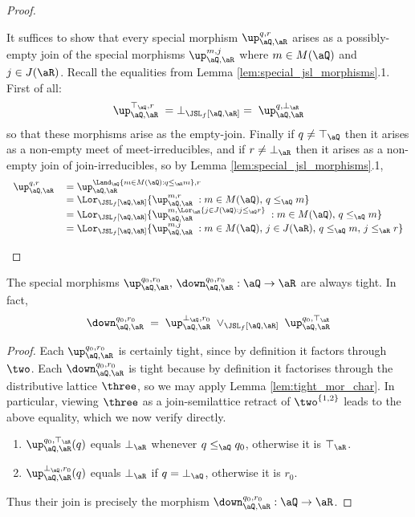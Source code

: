 \documentclass{article}
\begin{document}
\begin{proof}
\begin{enumerate}
It suffices to show that every special morphism $\up_{\aQ,\aR}^{q,r}$ arises as a possibly-empty join of the special morphisms $\up_{\aQ,\aR}^{m,j}$ where $m \in M(\aQ)$ and $j \in J(\aR)$. Recall the equalities from Lemma \ref{lem:special_jsl_morphisms}.1. First of all:
\[
\up_{\aQ,\aR}^{\top_\aQ,r} \; = \bot_{\JSL_f[\aQ,\aR]} = \; \up_{\aQ,\aR}^{q,\bot_\aR}
\]
so that these morphisms arise as the empty-join. Finally if $q \neq \top_\aQ$ then it arises as a non-empty meet of meet-irreducibles, and if $r \neq \bot_\aR$ then it arises as a non-empty join of join-irreducibles, so by Lemma \ref{lem:special_jsl_morphisms}.1,
\[
\begin{tabular}{lll}
$\up_{\aQ,\aR}^{q,r}$
&
$= \up_{\aQ,\aR}^{\Land_\aQ \{m \in M(\aQ) : q \leq_\aR m\},r}$
\\&
$= \Lor_{\JSL_f[\aQ,\aR]} \{ \up_{\aQ,\aR}^{m,r} \; : m \in M(\aQ), \, q \leq_\aQ m \}$
\\&
$= \Lor_{\JSL_f[\aQ,\aR]} \{ \up_{\aQ,\aR}^{m,\Lor_\aR \{ j \in J(\aQ) : j \leq_\aQ r \} } \; : m \in M(\aQ), \, q \leq_\aQ m \}$
\\&
$= \Lor_{\JSL_f[\aQ,\aR]} \{ \up_{\aQ,\aR}^{m,j} \; : m \in M(\aQ), \, j \in J(\aR), \, q \leq_\aQ m , \, j \leq_\aR r \}$
\end{tabular}
\]
\end{enumerate}
\end{proof}

\begin{corollary}
\label{cor:tight_special_morphisms}
The special morphisms $\up_{\aQ,\aR}^{q_0,r_0}, \, \down_{\aQ,\aR}^{q_0,r_0} : \aQ \to \aR$ are always tight. In fact,
\[
\down_{\aQ,\aR}^{q_0,r_0} 
\; = \; \up_{\aQ,\aR}^{\bot_\aQ,r_0} \; \lor_{\JSL_f[\aQ,\aR]} \; \up_{\aQ,\aR}^{q_0,\top_\aR}
\]
\end{corollary}

\begin{proof}
Each $\up_{\aQ,\aR}^{q_0,r_0}$ is certainly tight, since by definition it factors through $\two$. Each $\down_{\aQ,\aR}^{q_0,r_0}$ is tight because by definition it factorises through the distributive lattice $\three$, so we may apply Lemma \ref{lem:tight_mor_char}. In particular, viewing $\three$ as a join-semilattice retract of $\two^{\{1,2\}}$ leads to the above equality, which we now verify directly.
\begin{enumerate}
\item
$\up_{\aQ,\aR}^{q_0,\top_\aR}(q)$ equals $\bot_\aR$ whenever $q \leq_\aQ q_0$, otherwise it is $\top_\aR$.
\item
$\up_{\aQ,\aR}^{\bot_\aQ,r_0}(q)$ equals $\bot_\aR$ if $q = \bot_\aQ$, otherwise it is $r_0$.
\end{enumerate}
Thus their join is precisely the morphism $\down_{\aQ,\aR}^{q_0,r_0} : \aQ \to \aR$.
\end{proof}
\end{document}
